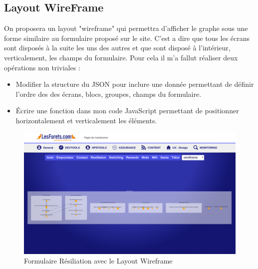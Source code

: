 \subsection{Layout WireFrame}
On proposera un layout "wireframe" qui permettra d'afficher le graphe sous une forme similaire au formulaire proposé sur le site. C'est a dire que tous les écrans sont disposés à la suite les uns des autres et que sont disposé à l'intérieur, verticalement, les champs du formulaire. 
Pour cela il m'a fallut réaliser deux opérations non triviales : 
\begin{itemize}
\item 
Modifier la structure du JSON pour inclure une donnée permettant de définir l'ordre des des écrans, blocs, groupes, champs du formulaire.
\item
Écrire une fonction dans mon code JavaScript permettant de positionner horizontalement et verticalement les éléments.
\end{itemize}
\vspace{0.5in}
\begin{figure}[!h]
\centering
\includegraphics[width=16cm]{outil/layout-wireframe.png}
\caption{Formulaire Résiliation avec le Layout Wireframe}
\end{figure}
\clearpage
